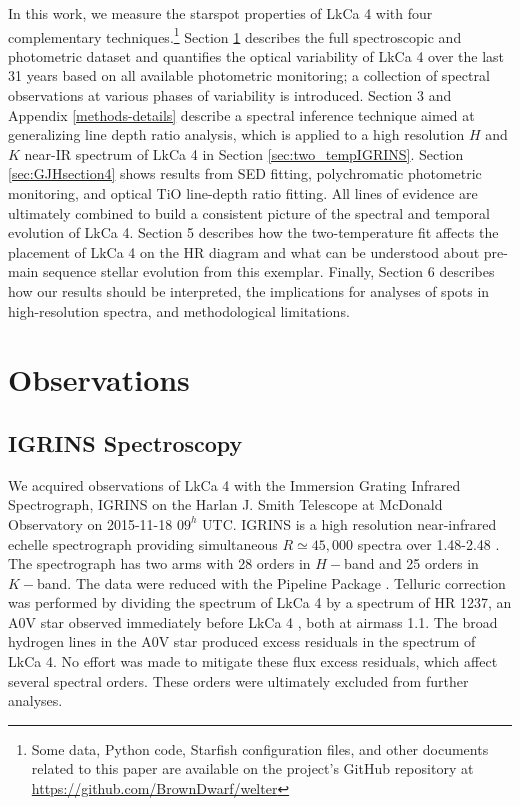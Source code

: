 \documentclass[twocolumn]{emulateapj}%
\newcommand{\name}{LkCa 4 }
\begin{document}
In this work, we measure the starspot properties of LkCa 4 with four complementary techniques.\footnote{Some data, Python code, Starfish configuration files, and other documents related to this paper are available on the project's GitHub repository at \url{https://github.com/BrownDwarf/welter}}  
Section \ref{sec:obs} describes the full spectroscopic and photometric dataset and 
quantifies the optical variability of LkCa 4 over the last 31 years based on all available photometric monitoring; a collection of spectral observations at various phases of variability is introduced.  Section 3 and Appendix \ref{methods-details} describe a spectral inference technique aimed at generalizing line depth ratio analysis, which is applied to a high resolution $H$ and $K$ near-IR spectrum of LkCa 4 in Section \ref{sec:two_tempIGRINS}.  Section \ref{sec:GJHsection4} shows results from SED fitting, polychromatic photometric monitoring, and optical TiO line-depth ratio fitting.  All lines of evidence are ultimately combined to build a consistent picture of the spectral and temporal evolution of LkCa 4.  Section 5 describes how the two-temperature fit affects the placement of LkCa 4 on the HR diagram and what can be understood about pre-main sequence stellar evolution from this exemplar.  Finally, Section 6 describes how our results should be interpreted, the implications for analyses of spots in high-resolution spectra, and methodological limitations.


\section{Observations}\label{sec:obs} 

\subsection{IGRINS Spectroscopy}\label{sec:igrins} 
We acquired observations of LkCa 4 with the Immersion Grating Infrared Spectrograph, IGRINS \citep{park14} on the Harlan J. Smith Telescope at McDonald Observatory on 2015-11-18 $09^h$ UTC.  IGRINS is a high resolution near-infrared echelle spectrograph providing simultaneous $R\simeq45,000$ spectra over 1.48-2.48 \um.  The spectrograph has two arms with 28 orders in $H-$band and 25 orders in $K-$band.  The data were reduced with the Pipeline Package \citep{jaejoonlee15}.  Telluric correction was performed by dividing the spectrum of \name by a spectrum of HR 1237, an A0V star observed immediately before \name, both at airmass 1.1.  The broad hydrogen lines in the A0V star produced excess residuals in the spectrum of LkCa 4.  No effort was made to mitigate these flux excess residuals, which affect several spectral orders.  These orders were ultimately excluded from further analyses.
\end{document}
